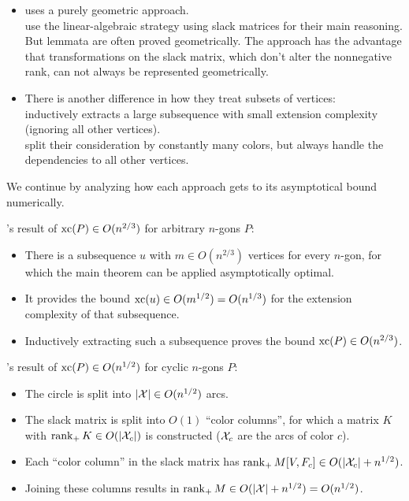 \begin{itemize}
  \item \citeauthor{shitov2020sublinear} uses a purely geometric approach.\\
        \citeauthor{kwan2020extension} use the linear-algebraic strategy using slack matrices for their main reasoning. But lemmata are often proved geometrically. The approach has the advantage that transformations on the slack matrix, which don't alter the nonnegative rank, can not always be represented geometrically.
  \item There is another difference in how they treat subsets of vertices:\\
        \citeauthor{shitov2020sublinear} inductively extracts a large subsequence with small extension complexity (ignoring all other vertices).\\
        \citeauthor{kwan2020extension} split their consideration by constantly many colors, but always handle the dependencies to all other vertices.
\end{itemize}

We continue by analyzing how each approach gets to its asymptotical bound numerically.

\citeauthor{shitov2020sublinear}'s result of $\operatorname{xc}(P) \in O(n^{2/3})$ for arbitrary $n$-gons $P$:
\begin{itemize}
  \item There is a subsequence $u$ with $m \in O(n^{2/3})$ vertices for every $n$-gon, for which the main theorem can be applied asymptotically optimal.
  \item It provides the bound $\operatorname{xc}(u) \in O(m^{1/2}) = O(n^{1/3})$ for the extension complexity of that subsequence.
  \item Inductively extracting such a subsequence proves the bound $\operatorname{xc}(P) \in O(n^{2/3})$.
\end{itemize}

\citeauthor{kwan2020extension}'s result of $\operatorname{xc}(P) \in O(n^{1/2})$ for cyclic $n$-gons $P$:
\begin{itemize}
  \item The circle is split into $\lvert\mathcal{X}\rvert \in O(n^{1/2})$ arcs.
  \item The slack matrix is split into $O(1)$ ``color columns'', for which a matrix $K$ with $\operatorname{rank}_+ K \in O(\lvert\mathcal{X}_c\rvert)$ is constructed ($\mathcal{X}_c$ are the arcs of color $c$).
  \item Each ``color column'' in the slack matrix has $\operatorname{rank}_+ M[V,F_c] \in O(\lvert\mathcal{X}_c\rvert + n^{1/2})$.
  \item Joining these columns results in $\operatorname{rank}_+ M \in O(\lvert\mathcal{X}\rvert + n^{1/2}) = O(n^{1/2})$.
\end{itemize}


